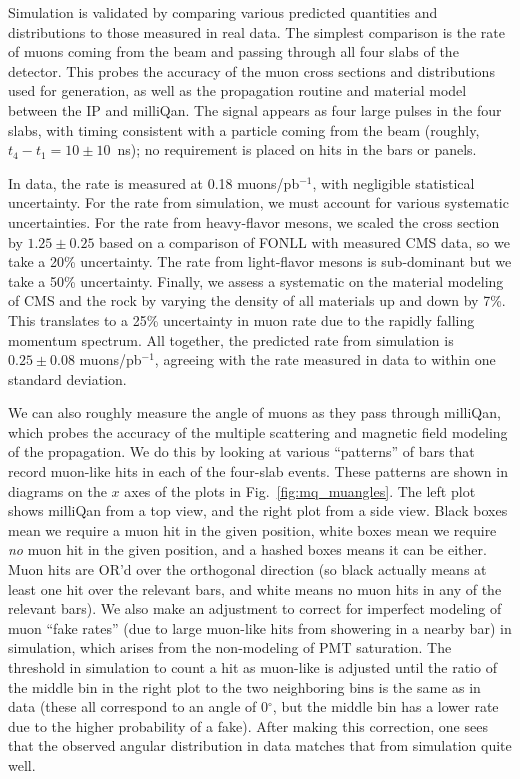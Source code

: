 {Simulation is validated by comparing various predicted quantities and distributions
to those measured in real data. The simplest comparison is the rate of muons coming
from the beam and passing through all four slabs of the detector. This probes the accuracy
of the muon cross sections and \pt distributions used for generation,
as well as the propagation routine and material model between the IP and milliQan.
The signal appears as four large pulses in the four slabs, with timing consistent
with a particle coming from the beam (roughly, $t_4-t_1=10\pm10$~ns); no requirement is
placed on hits in the bars or panels.

In data, the rate is measured at 0.18 muons/pb$^{-1}$, with negligible statistical
uncertainty. For the rate from simulation, we must account for various systematic
uncertainties. For the rate from heavy-flavor mesons, we scaled the cross section
by $1.25\pm0.25$ based on a comparison of FONLL with measured CMS data, so we take
a 20\% uncertainty. The rate from light-flavor mesons is sub-dominant but we take a
50\% uncertainty. Finally, we assess a systematic on the material modeling
of CMS and the rock by varying the density of all materials up and down by 7\%.
This translates to a 25\% uncertainty in muon rate due to the rapidly falling
momentum spectrum. All together, the predicted rate from simulation is
$0.25\pm0.08$ muons/pb$^{-1}$, agreeing with the rate measured in data
to within one standard deviation.

We can also roughly measure the angle of muons as they pass through milliQan,
which probes the accuracy of the multiple scattering and magnetic field modeling
of the propagation. We do this by looking at various ``patterns'' of bars
that record muon-like hits in each of the four-slab events. These patterns are shown
in diagrams on the $x$ axes of the plots in Fig.~\ref{fig:mq_muangles}. The left plot shows
milliQan from a top view, and the right plot from a side view. Black boxes mean we require
a muon hit in the given position, white boxes mean we require \textit{no} muon hit
in the given position, and a hashed boxes means it can be either. Muon hits are OR'd
over the orthogonal direction (so black actually means at least one hit over the relevant
bars, and white means no muon hits in any of the relevant bars).
We also make an adjustment to correct for imperfect modeling of muon ``fake rates''
(due to large muon-like hits from showering in a nearby bar) in simulation, which 
arises from the non-modeling of PMT saturation. The \Npe threshold in simulation
to count a hit as muon-like is adjusted until the ratio of the middle bin in the right
plot to the two neighboring bins is the same as in data (these all correspond to 
an angle of 0$^\circ$, but the middle bin has a lower rate due to the higher probability of a fake).
After making this correction, one sees that the observed angular distribution in data matches that
from simulation quite well. 

}
